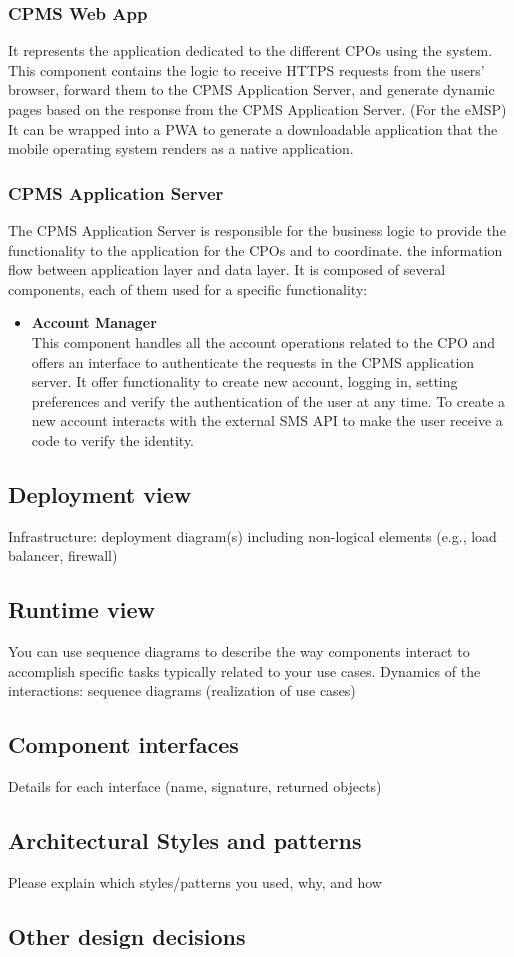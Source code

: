 \subsubsection{CPMS Web App}
It represents the application dedicated to the different CPOs using the system. This component contains the logic to receive HTTPS requests from the users' browser,
forward them to the CPMS Application Server, and generate dynamic pages based on the response from the CPMS Application Server. (For the eMSP) It can be wrapped into a PWA to generate a downloadable application that 
the mobile operating system renders as a native application.

\subsubsection{CPMS Application Server}
The CPMS Application Server is responsible for the business logic to provide the functionality to the application for the CPOs and to coordinate.
the information flow between application layer and data layer.
It is composed of several components, each of them used for a specific functionality:\\
\begin{itemize}
    \item \textbf{Account Manager} \\ This component handles all the account operations related to the CPO and offers an interface to authenticate the requests in the CPMS application server.
    It offer functionality to create new account, logging in, setting preferences and verify the authentication of the user at any time. 
    To create a new account interacts with the external SMS API to make the user receive a code to verify the identity. 
\end{itemize}


\subsection{Deployment view}
Infrastructure: deployment diagram(s) including non-logical elements (e.g., load balancer, firewall)
\subsection{Runtime view}
You can use sequence diagrams to describe the way components interact to accomplish specific tasks typically related to your use cases. Dynamics of the interactions: sequence
diagrams (realization of use cases)
\subsection{Component interfaces}
Details for each interface (name, signature, returned objects)
\subsection{Architectural Styles and patterns}
Please explain which styles/patterns you used, why, and how
\subsection{Other design decisions}